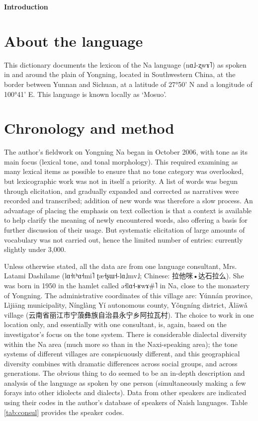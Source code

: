 \documentclass[oldfontcommands,oneside,a4paper,11pt]{article}
\newcommand{\ipa}[1]{{\phon #1}} %
\newcommand{\zh}[1]{{\cn #1}}
\begin{document}
 
	
	{\LARGE \textbf{Introduction}}
	\section{About the language} \label{sec:language}
	
	This dictionary documents the lexicon of the Na language (\ipa{nɑ˩-ʐwɤ˥}) as spoken in and around the plain of Yongning, located in Southwestern China, at the border between Yunnan and Sichuan, at a latitude of 27°50’ N and a longitude of 100°41’ E. This language is known locally as ‘Mosuo'. 
	
	\section{Chronology and method} \label{sec:method}
	
	The author's fieldwork on Yongning Na began in October 2006, with tone as its main focus (lexical tone, and tonal morphology). This required examining as many lexical items as possible to ensure that no tone category was overlooked, but lexicographic work was not in itself a priority. A list of words was begun through elicitation, and gradually expanded and corrected as narratives were recorded and transcribed; addition of new words was therefore a slow process. An advantage of placing the emphasis on text collection is that a context is available to help clarify the meaning of newly encountered words, also offering a basis for further discussion of their usage. But systematic elicitation of large amounts of vocabulary was not carried out, hence the limited number of entries: currently slightly under 3,000. 
	
	Unless otherwise stated, all the data are from one language consultant, Mrs. Latami Dashilame (\ipa{lɑ˧tʰɑ˧mi˥ ʈæ˧ʂɯ˧-lɑ˩mv˩}; Chinese: \zh{ 拉他咪•达石拉么}). She was born in 1950 in the hamlet called \ipa{ə˧lɑ˧-ʁwɤ\#˥} in Na, close to the monastery of Yongning. The administrative coordinates of this village are: Yúnnán province, Lìjiāng municipality, Nínglàng Yí autonomous county, Yǒngníng district, Ālāwǎ village (\zh{云南省丽江市宁蒗彝族自治县永宁乡阿拉瓦村}). The choice to work in one location only, and essentially with one consultant, is, again, based on the investigator's focus on the tone system. There is considerable dialectal diversity within the Na area (much more so than in the Naxi-speaking area); the tone systems of different villages are conspicuously different, and this geographical diversity combines with dramatic differences across social groups, and across generations. The obvious thing to do seemed to be an in-depth description and analysis of the language as spoken by one person (simultaneously making a few forays into other idiolects and dialects). Data from other speakers are indicated using their codes in the author's database of speakers of Naish languages. Table \ref{tab:consul} provides the speaker codes.
	
\end{document}
